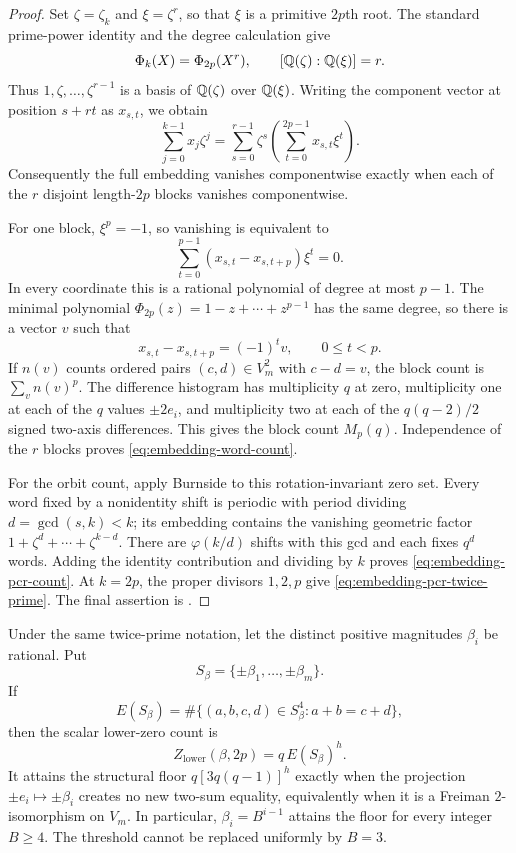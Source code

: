 \begin{proof}
Set $\zeta=\zeta_k$ and $\xi=\zeta^r$, so that $\xi$ is a primitive
$2p$th root.  The standard prime-power identity and the degree calculation
give
\[
  \Phi_k(X)=\Phi_{2p}(X^r),\qquad
  [\mathbb Q(\zeta):\mathbb Q(\xi)]=r.
\]
Thus $1,\zeta,\ldots,\zeta^{r-1}$ is a basis of $\mathbb Q(\zeta)$ over
$\mathbb Q(\xi)$.  Writing the component vector at position $s+rt$ as $x_{s,t}$,
we obtain
\[
  \sum_{j=0}^{k-1}x_j\zeta^j
  =\sum_{s=0}^{r-1}\zeta^s
     \left(\sum_{t=0}^{2p-1}x_{s,t}\xi^t\right).
\]
Consequently the full embedding vanishes componentwise exactly when each of
the $r$ disjoint length-$2p$ blocks vanishes componentwise.

For one block, $\xi^p=-1$, so vanishing is equivalent to
\[
  \sum_{t=0}^{p-1}(x_{s,t}-x_{s,t+p})\xi^t=0.
\]
In every coordinate this is a rational polynomial of degree at most $p-1$.
The minimal polynomial
$\Phi_{2p}(z)=1-z+\cdots+z^{p-1}$ has the same degree, so there is a vector
$v$ such that
\begin{equation}
  x_{s,t}-x_{s,t+p}=(-1)^t v,\qquad 0\le t<p.                          \label{eq:alternating-difference}
\end{equation}
If $n(v)$ counts ordered pairs $(c,d)\in V_m^2$ with $c-d=v$, the block count
is $\sum_v n(v)^p$.  The difference histogram has multiplicity $q$ at zero,
multiplicity one at each of the $q$ values $\pm2e_i$, and multiplicity two at
each of the $q(q-2)/2$ signed two-axis differences.  This gives
the block count $M_p(q)$.  Independence of the $r$ blocks proves
\eqref{eq:embedding-word-count}.

For the orbit count, apply Burnside to this rotation-invariant zero set.
Every word fixed by a nonidentity shift is periodic with period dividing
$d=\gcd(s,k)<k$; its embedding contains the vanishing geometric factor
$1+\zeta^d+\cdots+\zeta^{k-d}$.  There are $\varphi(k/d)$ shifts with this
gcd and each fixes $q^d$ words.  Adding the identity contribution and
dividing by $k$ proves \eqref{eq:embedding-pcr-count}.  At $k=2p$, the proper
divisors $1,2,p$ give \eqref{eq:embedding-pcr-twice-prime}.  The final
assertion is .
\end{proof}

\begin{corollary}
\label{cor:rational-lower-energy}
Under the same twice-prime notation, let the distinct positive magnitudes
$\beta_i$ be rational.  Put
\[
  S_\beta=\{\pm\beta_1,\ldots,\pm\beta_m\}.
\]
If
\[
  E(S_\beta)=\#\{(a,b,c,d)\in S_\beta^4:a+b=c+d\},
\]
then the scalar lower-zero count is
\begin{equation}
  Z_{\mathrm{lower}}(\beta,2p)=q\,E(S_\beta)^h.                        \label{eq:rational-energy-count}
\end{equation}
It attains the structural floor $q[3q(q-1)]^h$ exactly when the projection
$\pm e_i\mapsto\pm\beta_i$ creates no new two-sum equality, equivalently
when it is a Freiman $2$-isomorphism on $V_m$.  In particular,
$\beta_i=B^{i-1}$ attains the floor for every integer $B\ge4$.  The threshold
cannot be replaced uniformly by $B=3$.
\end{corollary}

